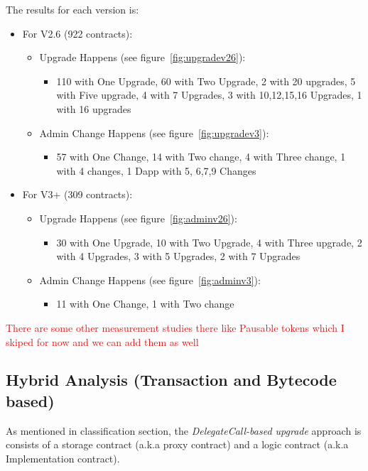 The results for each version is:
\begin{itemize}
  \item For V2.6 (922 contracts):
  \begin{itemize}
    \item Upgrade Happens (see figure~\ref{fig:upgradev26}):
    \begin{itemize}
      \item 110 with One Upgrade, 60 with Two Upgrade, 2 with 20 upgrades, 5 with Five upgrade, 4 with 7 Upgrades, 3 with 10,12,15,16 Upgrades, 1 with 16 upgrades
    \end{itemize}
    \item Admin Change Happens (see figure~\ref{fig:upgradev3}):
    \begin{itemize}
      \item 57 with One Change, 14 with Two change, 4 with Three change, 1 with 4 changes, 1 Dapp with 5, 6,7,9 Changes
    \end{itemize}
  \end{itemize}
  \item For V3+ (309 contracts):
  \begin{itemize}
    \item Upgrade Happens (see figure~\ref{fig:adminv26}):
    \begin{itemize}
      \item 30 with One Upgrade, 10 with Two Upgrade, 4 with Three upgrade, 2 with 4 Upgrades, 3 with 5 Upgrades, 2 with 7 Upgrades
    \end{itemize}
    \item Admin Change Happens (see figure~\ref{fig:adminv3}):
    \begin{itemize}
      \item 11 with One Change, 1 with Two change
    \end{itemize}
  \end{itemize}
\end{itemize}


\textcolor{red}{There are some other measurement studies there like Pausable tokens which I skiped for now and we can add them as well}



\subsection{Hybrid Analysis (Transaction and Bytecode based)}
As mentioned in classification section, the \textit{DelegateCall-based upgrade} approach is consists of a storage contract (a.k.a proxy contract) and a logic contract (a.k.a Implementation contract).


